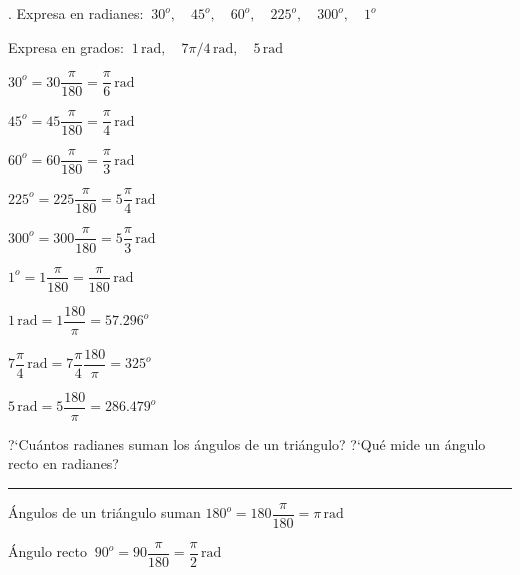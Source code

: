 \begin{miejemplo}
. Expresa en radianes: $\ 30^o,\quad 45^o,\quad 60^o,\quad 225^o,\quad 300^o, \quad 1^o$

\vspace{2mm} Expresa en grados: $\ 1 \, \mathrm{rad},\quad 7\pi/4 \, \mathrm{rad},\quad 5 \, \mathrm{rad}$

\vspace{5mm}

\begin{multicols}{3}
\vspace{2mm}$30^o=30 \dfrac{\pi}{180}=\dfrac \pi 6 \, \mathrm{rad}$

\vspace{2mm}$45^o=45 \dfrac{\pi}{180}=\dfrac \pi 4 \, \mathrm{rad}$

\vspace{2mm}$60^o=60 \dfrac{\pi}{180}=\dfrac \pi 3 \, \mathrm{rad}$

\vspace{2mm}$225^o=225 \dfrac{\pi}{180}=5\dfrac \pi 4 \, \mathrm{rad}$

\vspace{2mm}$300^o=300 \dfrac{\pi}{180}=5\dfrac \pi 3 \, \mathrm{rad}$

\vspace{2mm}$1^o=1 \dfrac{\pi}{180}=\dfrac \pi {180} \, \mathrm{rad}$

\vspace{2mm}$1\, \mathrm{rad}=1 \dfrac{180}{\pi}=57.296^o$

\vspace{2mm}$7\dfrac \pi 4 \, \mathrm{rad}=7\dfrac \pi 4 \dfrac{180}{\pi}=325^o$

\vspace{2mm}$5\, \mathrm{rad}=5 \dfrac{180}{\pi}=286.479^o$

\end{multicols}
\end{miejemplo}

\begin{miejercicio}

?`Cuántos radianes suman los ángulos de un triángulo? ?`Qué mide un ángulo recto en radianes?

\rule{250pt}{0.1pt}
\vspace{5mm}

Ángulos de un triángulo suman $180^o=180 \dfrac{\pi}{180}=\pi \, \mathrm{rad}$

\vspace{2mm}Ángulo recto $\ 90^o=90  \dfrac{\pi}{180}=\dfrac\pi 2 \, \mathrm{rad}$
	
\end{miejercicio}


